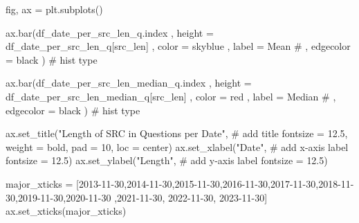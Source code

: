\documentclass[
  letterpaper,
  DIV=11,
  numbers=noendperiod]{scrartcl}
\newenvironment{Shaded}{\begin{snugshade}}{\end{snugshade}}
\newcommand{\CommentTok}[1]{\textcolor[rgb]{0.37,0.37,0.37}{#1}}
\newcommand{\DecValTok}[1]{\textcolor[rgb]{0.68,0.00,0.00}{#1}}
\newcommand{\FloatTok}[1]{\textcolor[rgb]{0.68,0.00,0.00}{#1}}
\newcommand{\NormalTok}[1]{\textcolor[rgb]{0.00,0.23,0.31}{#1}}
\newcommand{\OperatorTok}[1]{\textcolor[rgb]{0.37,0.37,0.37}{#1}}
\newcommand{\StringTok}[1]{\textcolor[rgb]{0.13,0.47,0.30}{#1}}
\begin{document}
\begin{Shaded}
\begin{Highlighting}[]
\NormalTok{fig, ax }\OperatorTok{=}\NormalTok{ plt.subplots()}

\NormalTok{ax.bar(df\_date\_per\_src\_len\_q.index}
\NormalTok{    ,  height }\OperatorTok{=}\NormalTok{ df\_date\_per\_src\_len\_q[}\StringTok{\textquotesingle{}src\_len\textquotesingle{}}\NormalTok{]}
\NormalTok{    ,  color }\OperatorTok{=} \StringTok{\textquotesingle{}skyblue\textquotesingle{}}
\NormalTok{    ,  label }\OperatorTok{=} \StringTok{\textquotesingle{}Mean\textquotesingle{}}
    \CommentTok{\# ,  edgecolor = \textquotesingle{}black\textquotesingle{}}
\NormalTok{      ) }\CommentTok{\# hist type}


\NormalTok{ax.bar(df\_date\_per\_src\_len\_median\_q.index}
\NormalTok{    ,  height }\OperatorTok{=}\NormalTok{ df\_date\_per\_src\_len\_median\_q[}\StringTok{\textquotesingle{}src\_len\textquotesingle{}}\NormalTok{]}
\NormalTok{    ,  color }\OperatorTok{=} \StringTok{\textquotesingle{}red\textquotesingle{}}
\NormalTok{    ,  label }\OperatorTok{=} \StringTok{\textquotesingle{}Median\textquotesingle{}}
    \CommentTok{\# ,  edgecolor = \textquotesingle{}black\textquotesingle{}}
\NormalTok{      ) }\CommentTok{\# hist type}

\NormalTok{ax.set\_title(}\StringTok{"Length of SRC in Questions per Date"}\NormalTok{, }\CommentTok{\# add title}
\NormalTok{             fontsize }\OperatorTok{=} \FloatTok{12.5}\NormalTok{,}
\NormalTok{             weight }\OperatorTok{=} \StringTok{\textquotesingle{}bold\textquotesingle{}}\NormalTok{,}
\NormalTok{             pad }\OperatorTok{=} \DecValTok{10}\NormalTok{,}
\NormalTok{             loc }\OperatorTok{=} \StringTok{\textquotesingle{}center\textquotesingle{}}\NormalTok{)}
\NormalTok{ax.set\_xlabel(}\StringTok{"Date"}\NormalTok{, }\CommentTok{\# add x{-}axis label}
\NormalTok{              fontsize }\OperatorTok{=} \FloatTok{12.5}\NormalTok{)}
\NormalTok{ax.set\_ylabel(}\StringTok{"Length"}\NormalTok{, }\CommentTok{\# add y{-}axis label}
\NormalTok{              fontsize }\OperatorTok{=} \FloatTok{12.5}\NormalTok{)}

\NormalTok{major\_xticks }\OperatorTok{=}\NormalTok{ [}\StringTok{\textquotesingle{}2013{-}11{-}30\textquotesingle{}}\NormalTok{,}\StringTok{\textquotesingle{}2014{-}11{-}30\textquotesingle{}}\NormalTok{,}\StringTok{\textquotesingle{}2015{-}11{-}30\textquotesingle{}}\NormalTok{,}\StringTok{\textquotesingle{}2016{-}11{-}30\textquotesingle{}}\NormalTok{,}\StringTok{\textquotesingle{}2017{-}11{-}30\textquotesingle{}}\NormalTok{,}\StringTok{\textquotesingle{}2018{-}11{-}30\textquotesingle{}}\NormalTok{,}\StringTok{\textquotesingle{}2019{-}11{-}30\textquotesingle{}}\NormalTok{,}\StringTok{\textquotesingle{}2020{-}11{-}30\textquotesingle{}}
\NormalTok{                ,}\StringTok{\textquotesingle{}2021{-}11{-}30\textquotesingle{}}\NormalTok{, }\StringTok{\textquotesingle{}2022{-}11{-}30\textquotesingle{}}\NormalTok{, }\StringTok{\textquotesingle{}2023{-}11{-}30\textquotesingle{}}\NormalTok{]}
\NormalTok{ax.set\_xticks(major\_xticks)}


\end{Highlighting}
\end{Shaded}
\end{document}
